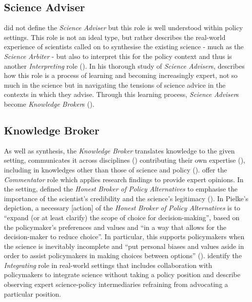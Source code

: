 \subsection{Science Adviser}
\textcite{Pielke2007} did not define the \emph{Science Adviser} but this role is well understood within policy settings. This role is not an ideal type, but rather describes the real-world experience of scientists called on to synthesise the existing science - much as the \emph{Science Arbiter} - but also to interpret this for the policy context and thus is another \emph{Interpreting} role (\cite{SteelLLS2004,SinghTKMMC2014}). In his thorough study of \emph{Science Adviser}s, \textcite{Obermeister2020} describes how this role is a process of learning and becoming increasingly expert, not so much in the science but in navigating the tensions of science advice in the contexts in which they advise. Through this learning process, \emph{Science Adviser}s become \emph{Knowledge Broker}s (\cite{Obermeister2020,GluckmanBK2021}).

\subsection{Knowledge Broker}
As well as synthesis, the \emph{Knowledge Broker} translates knowledge to the given setting, communicates it across disciplines (\cite{GogginEtAl2015}) contributing their own expertise (\cite{RapleyD2014}), including in knowledges other than those of science and policy (\cite{Gluckman2014}). \textcite{KarkkainenLKK2024} offer the \emph{Commentator} role which applies research findings to provide expert opinions. In the \SPI{} setting, \textcite{Pielke2007} defined the \emph{Honest Broker of Policy Alternatives} to emphasise the importance of the scientist's credibility and the science's legitimacy (\cite{DuncanRE2020}). In Pielke's depiction, a necessary [action] of the \emph{Honest Broker of Policy Alternatives} is to ``expand (or at least clarify) the scope of choice for decision-making'', based on the policymaker's preferences and values and ``in a way that allows for the decision-maker to reduce choice''. In particular, this supports policymakers when the science is inevitably incomplete and ``put personal biases and values aside in order to assist policymakers in making choices between options'' (\cite{GluckmanBK2021}). \textcite{SteelLLS2004,SinghTKMMC2014} identify the \emph{Integrating} role in real-world settings that includes collaboration with policymakers to integrate science without taking a policy position and \textcite{BednarekSHG2015} describe observing expert science-policy intermediaries refraining from advocating a particular position.

